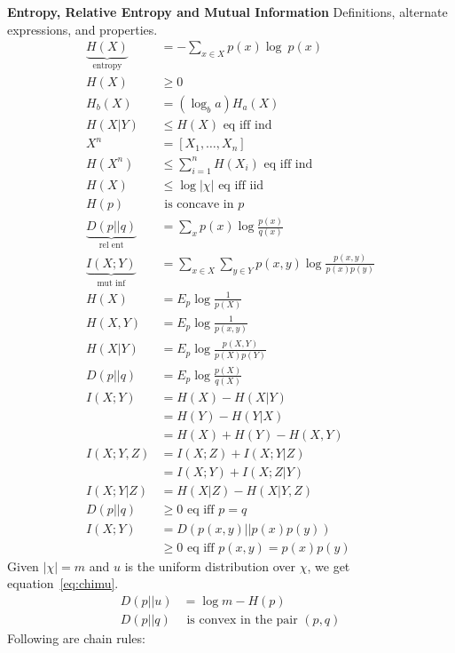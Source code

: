 \documentclass[10pt]{article}
\begin{document}
\begin{tiny}
\begin{multicols}{3}

\textbf{\scriptsize Entropy, Relative Entropy and Mutual Information}
Definitions, alternate expressions, and properties.
\begin{align}
\underbrace{H(X)}_\text{entropy}&= -\sum_{x\in X} p(x) \log\ p(x) \label{eq:entropy}\\
H(X)& \geq 0\\
H_b(X)&= (\log_b a)H_a(X)\\
H(X|Y)& \leq  H(X)\text{ eq iff ind} \label{eq:conditioning}\\
X^n&=[X_1,\ldots,X_n]\\
H(X^n)& \leq \sum_{i=1}^n H(X_i)\text{ eq iff ind} \label{eq:jointsum}\\
H(X)&\leq  \log |\chi|  \text{ eq iff iid}\label{eq:alphabetentropy}\\
H(p)&\text{ is concave in $p$}\\
\underbrace{D(p||q)}_\text{rel ent} & = \sum_x p(x) \log \frac{p(x)}{q(x)}\\
\underbrace{I(X;Y)}_\text{mut inf} & = \sum_{x\in X} \sum_{y \in Y} p(x,y) \log \frac{p(x,y)}{p(x)p(y)}\\
H(X)&=E_p \log \frac{1}{p(X)}\\
H(X,Y)&=E_p\log \frac{1}{p(x,y)}\\
H(X|Y)&=E_p\log \frac{p(X,Y)}{p(X)p(Y)}\\
D(p||q)&=E_p\log \frac{p(X)}{q(X)}\\
I(X;Y)&=H(X)-H(X|Y)\\
&=H(Y)-H(Y|X)\\
&=H(X)+H(Y)-H(X,Y)\\
I(X;Y,Z) &= I(X;Z) + I(X;Y|Z) \\
&= I(X;Y) + I(X;Z|Y)\\
I(X;Y|Z) &= H(X|Z) - H(X|Y,Z) \\
D(p||q)&\geq 0 \text{ eq iff $p=q$}\\
I(X;Y)&=D(p(x,y)||p(x)p(y))\\
	&\geq 0 \text{ eq iff $p(x,y)=p(x)p(y)$}
\end{align}
Given $|\chi|=m$ and $u$ is the uniform distribution over $\chi$, we get equation~\ref{eq:chimu}.
\begin{align}
D(p||u)&=\log m - H(p)\label{eq:chimu}\\
D(p||q)&\text{ is convex in the pair }(p,q)
\end{align}
Following are chain rules:

\end{multicols}
\end{tiny}
\end{document}
